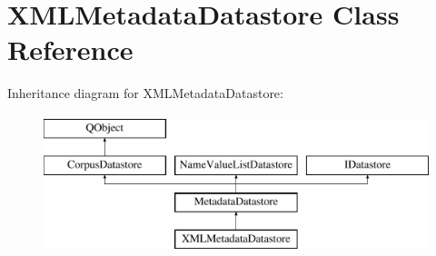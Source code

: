 \hypertarget{class_x_m_l_metadata_datastore}{}\section{X\+M\+L\+Metadata\+Datastore Class Reference}
\label{class_x_m_l_metadata_datastore}
Inheritance diagram for X\+M\+L\+Metadata\+Datastore\+:\begin{figure}[H]
\begin{center}
\leavevmode
\includegraphics[height=4.000000cm]{class_x_m_l_metadata_datastore}
\end{center}
\end{figure}
